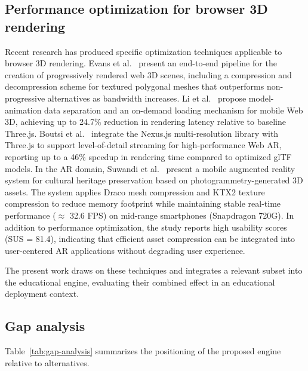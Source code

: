 \subsection{Performance optimization for browser 3D rendering}
Recent research has produced specific optimization techniques applicable to browser 3D rendering. Evans et al.~\cite{Evans2017} present an end-to-end pipeline for the creation of progressively rendered web 3D scenes, including a compression and decompression scheme for textured polygonal meshes that outperforms non-progressive alternatives as bandwidth increases. Li et al.~\cite{Li2020} propose model-animation data separation and an on-demand loading mechanism for mobile Web 3D, achieving up to 24.7\% reduction in rendering latency relative to baseline Three.js. Boutsi et al.~\cite{Boutsi2023} integrate the Nexus.js multi-resolution library with Three.js to support level-of-detail streaming for high-performance Web AR, reporting up to a 46\% speedup in rendering time compared to optimized glTF models. In the AR domain, Suwandi et al.~\cite{Suwandi2026} present a mobile augmented reality system for cultural heritage preservation based on photogrammetry-generated 3D assets. The system applies Draco mesh compression and KTX2 texture compression to reduce memory footprint while maintaining stable real-time performance (\(\approx\) 32.6 FPS) on mid-range smartphones (Snapdragon 720G). In addition to performance optimization, the study reports high usability scores (SUS = 81.4), indicating that efficient asset compression can be integrated into user-centered AR applications without degrading user experience.

The present work draws on these techniques and integrates a relevant subset into the educational engine, evaluating their combined effect in an educational deployment context.

\subsection{Gap analysis}
Table~\ref{tab:gap-analysis} summarizes the positioning of the proposed engine relative to alternatives.


